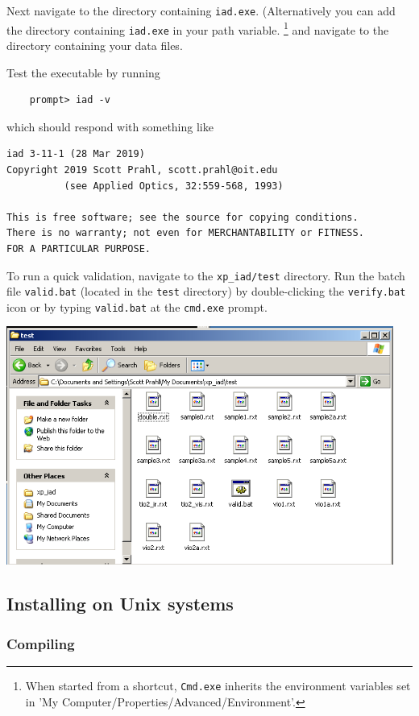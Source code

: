 \documentclass{article}
\begin{document}
Next navigate to the directory containing \texttt{iad.exe}.  
(Alternatively you 
can add the directory containing \texttt{iad.exe} in your path variable.%
\footnote{
When started from a shortcut, \texttt{Cmd.exe} inherits the environment variables set in 
'My Computer/Properties/Advanced/Environment'.} and
navigate to the directory containing your data files.

Test the executable by running
\begin{verbatim}
    prompt> iad -v
\end{verbatim}
which should respond with something like
\begin{verbatim}
iad 3-11-1 (28 Mar 2019)
Copyright 2019 Scott Prahl, scott.prahl@oit.edu
          (see Applied Optics, 32:559-568, 1993)

This is free software; see the source for copying conditions.
There is no warranty; not even for MERCHANTABILITY or FITNESS.
FOR A PARTICULAR PURPOSE.
\end{verbatim}

To run a quick validation, navigate to the \texttt{xp\_iad/test} directory.  Run the
batch file \texttt{valid.bat} (located in the \texttt{test} directory) by
double-clicking the \texttt{verify.bat} icon or by typing \texttt{valid.bat} at
the \texttt{cmd.exe} prompt.
\begin{center}
\includegraphics[width=5in]{valid.png}
\end{center}

\subsection{Installing on Unix systems}

\subsubsection{Compiling}
\end{document}
